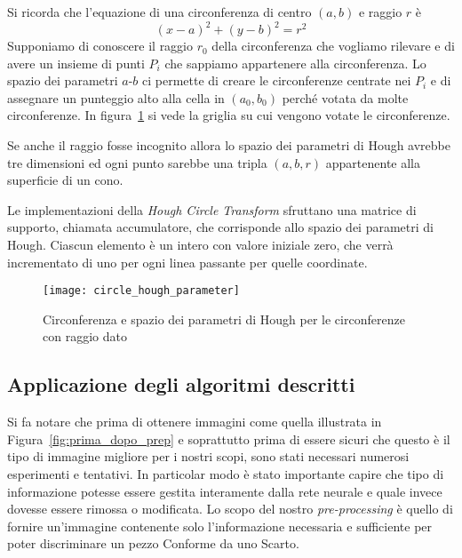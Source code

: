 Si ricorda che l'equazione di una circonferenza di centro $(a,b)$ e raggio $r$ è
\begin{equation} \label{eq:circonferenza}
  (x - a)^2 + (y - b)^2 = r^2
\end{equation}
Supponiamo di conoscere il raggio $r_0$ della circonferenza che vogliamo rilevare e di avere un insieme di punti $P_i$ che sappiamo appartenere alla circonferenza.
Lo spazio dei parametri $a$-$b$ ci permette di creare le circonferenze centrate nei $P_i$ e di assegnare un punteggio alto alla cella in $(a_0,b_0)$ perché votata da molte circonferenze.
In figura~\ref{fig:hough_parametr_circ} si vede la griglia su cui vengono votate le circonferenze.

Se anche il raggio fosse incognito allora lo spazio dei parametri di Hough avrebbe tre dimensioni ed ogni punto sarebbe una tripla $(a,b,r)$ appartenente alla superficie di un cono.

Le implementazioni della \textit{Hough Circle Transform} sfruttano una matrice di supporto, chiamata accumulatore, che corrisponde allo spazio dei parametri di Hough.
Ciascun elemento è un intero con valore iniziale zero, che verrà incrementato di uno per ogni linea passante per quelle coordinate.
\begin{figure}[ht]
  \begin{center}
      \texttt{[image: circle\_hough\_parameter]}
      \caption{Circonferenza e spazio dei parametri di Hough per le circonferenze con raggio dato}
      \label{fig:hough_parametr_circ}
  \end{center}
\end{figure}



\clearpage
\subsection {Applicazione degli algoritmi descritti}
Si fa notare che prima di ottenere immagini come quella illustrata in Figura~\ref{fig:prima_dopo_prep} e soprattutto prima di essere sicuri che questo è il tipo di immagine migliore per i nostri scopi, sono stati necessari numerosi esperimenti e tentativi.
In particolar modo è stato importante capire che tipo di informazione potesse essere gestita interamente dalla rete neurale e quale invece dovesse essere rimossa o modificata.
Lo scopo del nostro \textit{pre-processing} è quello di fornire un'immagine contenente solo l'informazione necessaria e sufficiente per poter discriminare un pezzo Conforme da uno Scarto.

